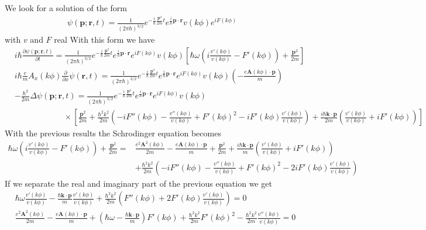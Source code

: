 We look for a solution of the form
\begin{align}
    \psi({\bm p};{\bm r},t)=\frac1{(2\pi\hbar)^{3/2}}e^{-\frac{i}{\hbar}\frac{{\bm p}^2}{2m}t}e^{\frac{i}{\hbar}{\bm p}\cdot{\bm r}}v(k\phi)e^{iF(k\phi)}
\end{align}
with ${v}$ and $F$ real
With this form we have
\begin{align}
     & i\hbar\frac{\partial\psi({\bm p};{\bm r},t)}{\partial t}=\frac1{(2\pi\hbar)^{3/2}}e^{-\frac{i}{\hbar}\frac{{\bm p}^2}{2m}t}e^{\frac{i}{\hbar}{\bm p}\cdot{\bm r}}e^{iF(k\phi)}v(k\phi)\left[\hbar \omega \left(i\frac{v'(k\phi)}{v(k\phi)}-F'(k\phi)\right)+\frac{{\bm p}^2}{2m}\right] \\
     & i\hbar\frac{e}mA_x(k\phi)\frac{\partial}{\partial x}\psi({\bm r},t)=\frac1{(2\pi\hbar)^{3/2}}e^{-\frac{i}{\hbar}\frac{{\bm p}^2}{2m}t}e^{\frac{i}{\hbar}{\bm p}\cdot{\bm r}}e^{iF(k\phi)}v(k\phi)\left(-\frac{e{\bm A(k \phi)}\cdot{\bm p}}{m}\right)                                   \\
     & -\frac{\hbar^2}{2m}\Delta\psi({\bm p};{\bm r},t)=\frac1{(2\pi\hbar)^{3/2}}e^{-\frac{i}{\hbar}\frac{{\bm p}^2}{2m}t}e^{\frac{i}{\hbar}{\bm p}\cdot{\bm r}}e^{iF(k\phi)}v(k\phi)\nonumber                                                                                                 \\
     & \qquad\qquad\qquad\times\left[\frac{{\bm p}^2}{2m}+\frac{\hbar^2k^2}{2m}\left(-iF''(k\phi)-\frac{v''(k\phi)}{v(k\phi)}+F'(k\phi)^2-iF'(k\phi)\frac{v'(k\phi)}{v(k\phi)}\right)+\frac{i\hbar {\bm k}\cdot{\bm p}}{2m}\left(\frac{v'(k\phi)}{v(k\phi)}+iF'(k\phi)\right)\right]
\end{align}
With the previous results the Schrodinger equation becomes
\begin{align}
    \hbar \omega \left(i\frac{v'(k\phi)}{v(k\phi)}-F'(k\phi)\right)+\frac{{\bm p}^2}{2m}= & \frac{e^2{\bm A}^2(k\phi)}{2m}-\frac{e{\bm A(k \phi)}\cdot{\bm p}}{m}+\frac{{\bm p}^2}{2m}+\frac{i\hbar {\bm k}\cdot{\bm p}}{m}\left(\frac{v'(k\phi)}{v(k\phi)}+iF'(k\phi)\right)\nonumber \\
                                                                                          & +\frac{\hbar^2k^2}{2m}\left(-iF''(k\phi)-\frac{v''(k\phi)}{v(k\phi)}+F'(k\phi)^2-2iF'(k\phi)\frac{v'(k\phi)}{v(k\phi)}\right)
\end{align}
If we separate the real and imaginary part of the previous equation we get
\begin{align}
     & \hbar \omega \frac{v'(k\phi)}{v(k\phi)}-\frac{\hbar {\bm k}\cdot{\bm p}}{m}\frac{v'(k\phi)}{v(k\phi)}+\frac{\hbar^2k^2}{2m}\left(F''(k\phi)+2F'(k\phi)\frac{v'(k\phi)}{v(k\phi)}\right)=0                                      \\
     & \frac{e^2{\bm A}^2(k\phi)}{2m}-\frac{e{\bm A(k \phi)}\cdot{\bm p}}{m}+\left(\hbar\omega -\frac{\hbar {\bm k}\cdot{\bm p}}m\right)F'(k\phi)+\frac{\hbar^2k^2}{2m}F'(k\phi)^2-\frac{\hbar^2k^2}{2m}\frac{v''(k\phi)}{v(k\phi)}=0
\end{align}

